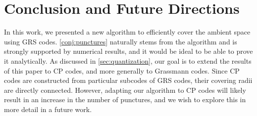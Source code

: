 \documentclass[conference]{IEEEtran}
\begin{document}
\section{Conclusion and Future Directions}
\label{sec:conclusion}

In this work, we presented a new algorithm to efficiently cover the ambient space using GRS codes. 
\autoref{conj:punctures} naturally stems from the algorithm and is strongly supported by numerical results, and it would be ideal to be able to prove it analytically. 
As discussed in \autoref{sec:quantization}, our goal %
is to extend the results of this paper to CP codes, and more generally to Grassmann codes. 
Since CP codes are constructed from particular subcodes of GRS codes, their covering radii are directly connected. 
However, adapting our algorithm to CP codes will likely result in an increase in the number of punctures, and we wish to explore this in more detail in a future work. 




\end{document}

